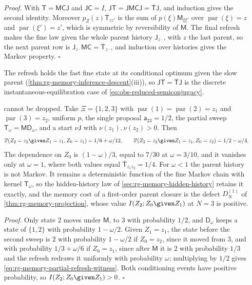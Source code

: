 \noindent\emph{Proof.}
With $\mathsf T=\mathsf M\mathsf C\mathsf J$ and $\mathsf J\mathsf C=I$,
$\mathsf J\mathsf T=\mathsf J\mathsf M\mathsf C\mathsf J=\overline{\mathsf T}\mathsf J$,
and induction gives the second identity. Moreover $p_Z(z)\overline{\mathsf T}_{zz'}$
is the sum of $p(\xi)\mathsf M_{\xi\xi'}$ over $\operatorname{par}(\xi)=z$ and
$\operatorname{par}(\xi')=z'$, which is symmetric by reversibility of $\mathsf M$. The
final refresh makes the fine law given the whole parent history $\mathsf J_{z\cdot}$,
with $z$ the last parent, so the next parent row is
$\mathsf J_{z\cdot}\mathsf M\mathsf C=\overline{\mathsf T}_{z\cdot}$, and induction over
histories gives the Markov property. $\square$

The refresh holds the fast fine state at its conditional optimum given the slow parent
(\cref{thm:rg-memory-inference-descent}(iii)), so $\mathsf J\mathsf T=\overline{\mathsf T}\mathsf J$
is the discrete instantaneous-equilibration case of \eqref{eq:obs-reduced-semiconjugacy}.

 cannot be dropped. Take
$\Xi=\{1,2,3\}$ with $\operatorname{par}(1)=\operatorname{par}(2)=z_1$ and
$\operatorname{par}(3)=z_2$, uniform $p$, the single proposal
$\mathsf a_{23}=1/2$, the partial sweep
$\mathsf T_\omega=\mathsf M\mathsf D_\omega$, and a start $\nu\mathsf J$ with
$\nu(z_1),\nu(z_2)>0$. Then
\begin{equation}
\mathbb P(Z_2=z_2\given Z_1=z_1,Z_0=z_1)=1/6+\omega/12,
\qquad
\mathbb P(Z_2=z_2\given Z_1=z_1,Z_0=z_2)=1/2-\omega/4.
\label{eq:rg-memory-partial-refresh-witness}
\end{equation}
The dependence on $Z_0$ is $(1-\omega)/3$, equal to $7/30$ at $\omega=3/10$, and it
vanishes only at $\omega=1$, where both values equal
$\overline{\mathsf T}_{z_1z_2}=1/4$. For $\omega<1$ the parent history is not
Markov. It remains a deterministic function of the fine Markov chain with kernel
$\mathsf T_\omega$, so the hidden-history law of \cref{sec:rg-memory-hidden-history}
retains it exactly, and the memory cost of a first-order parent closure is the
defect $D_N^{(1)}$ of \cref{thm:rg-memory-projection}, whose value
$I(Z_2;Z_0\given Z_1)$ at $N=3$ is positive. 

\noindent\emph{Proof.}
Only state $2$ moves under $\mathsf M$, to $3$ with probability $1/2$, and
$\mathsf D_\omega$ keeps a state of $\{1,2\}$ with probability $1-\omega/2$. Given
$Z_1=z_1$, the state before the second sweep is $2$ with probability
$1-\omega/2$ if $Z_0=z_2$, since it moved from $3$, and with probability
$1/3+\omega/6$ if $Z_0=z_1$, since after $\mathsf M$ it is $2$ with probability
$1/3$ and the refresh redraws it uniformly with probability $\omega$; multiplying
by $1/2$ gives
\eqref{eq:rg-memory-partial-refresh-witness}. Both conditioning events have positive
probability, so $I(Z_2;Z_0\given Z_1)>0$. $\square$

